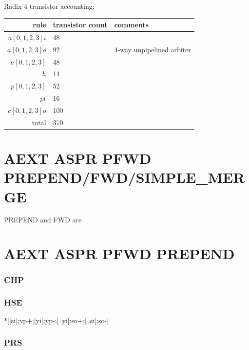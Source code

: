\documentclass{article}
\begin{document}
\noindent
Radix 4 transistor accounting:

\begin{center}
    \begin{tabular}{|r|l|l|}
    \hline
    rule & transistor count & comments \\ \hline
    $a[0,1,2,3]i$ & 48 & \\ \hline
    $a[0,1,2,3]o$ & 92 & 4-way unpipelined arbiter \\ \hline
    $a[0,1,2,3]$ & 48 & \\ \hline
    $h$ & 14 & \\ \hline
    $p[0,1,2,3]$ & 52 & \\ \hline
    $pt$ & 16 & \\ \hline
    $c[0,1,2,3]o$ & 100 & \\ \hline
    \hline total & 370 & \\ \hline
    \end{tabular}
\end{center}

\section{AEXT ASPR PFWD PREPEND/FWD/SIMPLE\_MERGE}

PREPEND and FWD are

\section{AEXT ASPR PFWD PREPEND}

\subsubsection*{CHP}

\subsubsection*{HSE}
\begin{hse}
*[[si];yp+;[yi];yp-;[~yi];so+;[~si];so-]
\end{hse}

\subsubsection*{PRS}
\end{document}
